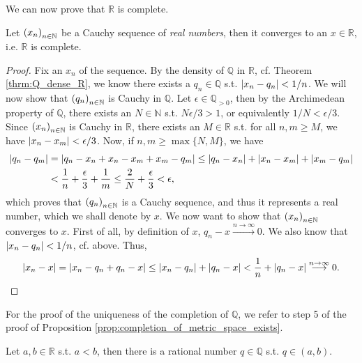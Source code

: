 We can now prove that $\mathbb R$ is complete.

\begin{proposition}\label{prop:R_is_complete}
	Let $\seq[x_n]$ be a Cauchy sequence of \textit{real numbers}, then it converges to an $x\in\mathbb R$, i.e. $\mathbb R$ is complete.
\end{proposition}

\begin{proof}
	Fix an $x_n$ of the sequence. By the density of $\mathbb Q$ in $\mathbb R$, cf. Theorem \ref{thrm:Q_dense_R}, we know there exists a $q_n\in\mathbb Q$ s.t. $\abs{x_n - q_n} < 1/n$. We will now show that $\seq[q_n]$ is Cauchy in $\mathbb Q$. Let $\epsilon\in\mathbb Q_{> 0}$, then by the Archimedean property of $\mathbb Q$, there exists an $N\in\mathbb N$ s.t. $N\epsilon/3 > 1$, or equivalently $1/N < \epsilon/3$. Since $\seq[x_n]$ is Cauchy in $\mathbb R$, there exists an $M\in\mathbb R$ s.t. for all $n, m\geq M$, we have $\abs{x_n - x_m} < \epsilon/3$. Now, if $n, m\geq \max\{N, M\}$, we have 
	\begin{align*}
		\abs{q_n - q_m} &= \abs{q_n -x_n + x_n - x_m + x_m - q_m } \leq \abs{q_n - x_n} + \abs{x_n - x_m} + \abs{x_m - q_m} 
		\\  &< \frac{1}{n} + \frac{\epsilon}{3} + \frac{1}{m} \leq \frac{2}{N} + \frac{\epsilon}{3} < \epsilon,
	\end{align*}
	which proves that $\seq[q_n]$ is a Cauchy sequence, and thus it represents a real number, which we shall denote by $x$. We now want to show that $\seq[x_n]$ converges to $x$. First of all, by definition of $x$, $q_n - x\overset{n\to\infty}{\longrightarrow} 0$. We also know that $\abs{x_n - q_n} < 1/n$, cf. above. Thus, 
	\begin{align*}
		\abs{x_n - x} = \abs{x_n - q_n + q_n - x} \leq \abs{x_n - q_n} + \abs{q_n - x} < \frac{1}{n} + \abs{q_n - x}\overset{n\to\infty}{\longrightarrow} 0.
	\end{align*}
\end{proof}

\begin{remark}
	For the proof of the uniqueness of the completion of $\mathbb Q$, we refer to step 5 of the proof of Proposition \ref{prop:completion_of_metric_space_exists}.
\end{remark}

\begin{theorem}
	Let $a, b\in\mathbb R$ s.t. $a < b$, then there is a rational number $q\in\mathbb Q$ s.t. $q\in (a, b)$.
\end{theorem}

